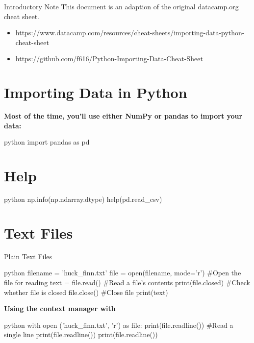 \begin{alerttextbox}{Introductory Note}
This document is an adaption of the original datacamp.org cheat sheet.\\
\begin{itemize}
    \item {https://www.datacamp.com/resources/cheat-sheets/importing-data-python-cheat-sheet}
    \item {https://github.com/f616/Python-Importing-Data-Cheat-Sheet}
\end{itemize}

\end{alerttextbox}


\section{Importing Data in Python}

\begin{myblock}{}
\textbf{Most of the time, you’ll use either NumPy or pandas to import your data:}
\begin{codebox}{python}{}
import pandas as pd
\end{codebox}
\end{myblock}


\section{Help}

\begin{codebox}{python}{}
np.info(np.ndarray.dtype)
help(pd.read_csv)
\end{codebox}


\section{Text Files}

\begin{myblock}{Plain Text Files}
\begin{codebox}{python}{}
filename = 'huck_finn.txt'
file = open(filename, mode='r')  #Open the file for reading
text = file.read()  #Read a file’s contents
print(file.closed)  #Check whether file is closed
file.close()  #Close file
print(text)
\end{codebox}
\textbf{Using the context manager with}
\begin{codebox}{python}{}
with open ('huck_finn.txt', 'r') as file:
    print(file.readline())  #Read a single line
    print(file.readline())
    print(file.readline())
\end{codebox}
\end{myblock}

